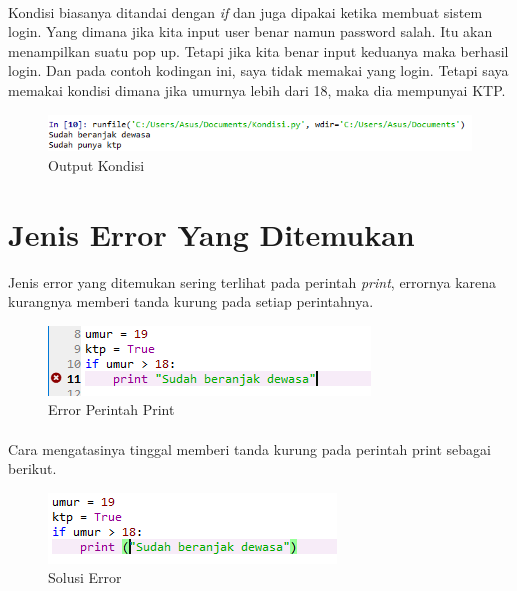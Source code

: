\documentclass{article}
\begin{document}
\paragraph{}
Kondisi biasanya ditandai dengan \textit{if} dan juga dipakai ketika membuat sistem login. Yang dimana jika kita input user benar namun password salah. Itu akan menampilkan suatu pop up. Tetapi jika kita benar input keduanya maka berhasil login. Dan pada contoh kodingan ini, saya tidak memakai yang login. Tetapi saya memakai kondisi dimana jika umurnya lebih dari 18, maka dia mempunyai KTP.
\begin{figure}[!htbp]
    \centering
    \includegraphics[scale=0.6]{OutputKondisi.PNG}
    \caption{Output Kondisi}
\end{figure}
\newpage
\section{Jenis Error Yang Ditemukan}
Jenis error yang ditemukan sering terlihat pada perintah \textit{print}, errornya karena kurangnya memberi tanda kurung pada setiap perintahnya.
\begin{figure}[!htbp]
    \centering
    \includegraphics{error.PNG}
    \caption{Error Perintah Print}
\end{figure}
\paragraph{}
Cara mengatasinya tinggal memberi tanda kurung pada perintah print sebagai berikut.
\begin{figure}[!htbp]
    \centering
    \includegraphics{solusi.PNG}
    \caption{Solusi Error}
\end{figure}
\newpage
\end{document}
